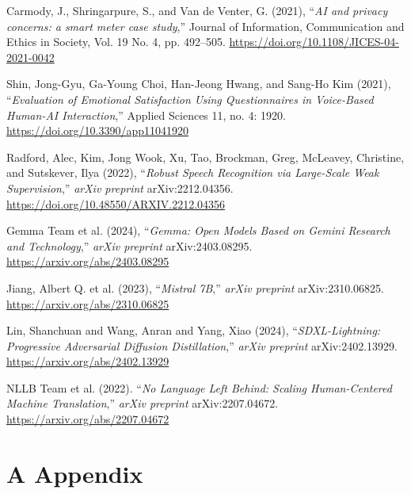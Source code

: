 \documentclass[12pt]{article}
\begin{document}
\begin{thebibliography}{1}

Carmody, J., Shringarpure, S., and Van de Venter, G. (2021), ``\emph{AI and privacy concerns: a smart meter case study},'' Journal of Information, Communication and Ethics in Society, Vol. 19 No. 4, pp. 492--505. \href{https://doi.org/10.1108/JICES-04-2021-0042}{https://doi.org/10.1108/JICES-04-2021-0042}

Shin, Jong-Gyu, Ga-Young Choi, Han-Jeong Hwang, and Sang-Ho Kim (2021), ``\emph{Evaluation of Emotional Satisfaction Using Questionnaires in Voice-Based Human-AI Interaction},'' Applied Sciences 11, no. 4: 1920. \href{https://doi.org/10.3390/app11041920}{https://doi.org/10.3390/app11041920}

Radford, Alec, Kim, Jong Wook, Xu, Tao, Brockman, Greg, McLeavey, Christine, and Sutskever, Ilya (2022), ``\emph{Robust Speech Recognition via Large-Scale Weak Supervision},'' \emph{arXiv preprint} arXiv:2212.04356. \href{https://doi.org/10.48550/ARXIV.2212.04356}{https://doi.org/10.48550/ARXIV.2212.04356}

Gemma Team et al. (2024), ``\emph{Gemma: Open Models Based on Gemini Research and Technology},'' \emph{arXiv preprint} arXiv:2403.08295. \url{https://arxiv.org/abs/2403.08295}

Jiang, Albert Q. et al. (2023), ``\emph{Mistral 7B},'' \emph{arXiv preprint} arXiv:2310.06825. \url{https://arxiv.org/abs/2310.06825}

Lin, Shanchuan and Wang, Anran and Yang, Xiao (2024), ``\emph{SDXL-Lightning: Progressive Adversarial Diffusion Distillation},'' \emph{arXiv preprint} arXiv:2402.13929. \url{https://arxiv.org/abs/2402.13929}

NLLB Team et al. (2022). ``\emph{No Language Left Behind: Scaling Human-Centered Machine Translation},'' \emph{arXiv preprint} arXiv:2207.04672. \url{https://arxiv.org/abs/2207.04672}

\end{thebibliography}

\newpage 
\section*{A Appendix}
\end{document}
